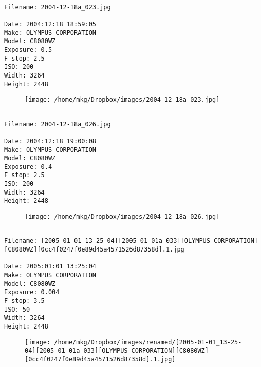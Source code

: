 \clearpage
\onecolumn
\noindent 
\noindent
\begin{lstlisting}

Filename: 2004-12-18a_023.jpg

Date: 2004:12:18 18:59:05
Make: OLYMPUS CORPORATION
Model: C8080WZ
Exposure: 0.5
F stop: 2.5
ISO: 200
Width: 3264
Height: 2448
\end{lstlisting}
\clearpage

\begin{figure}
\texttt{[image: /home/mkg/Dropbox/images/2004-12-18a\_023.jpg]}
\end{figure}
    
\clearpage
\onecolumn
\noindent 
\noindent
\begin{lstlisting}

Filename: 2004-12-18a_026.jpg

Date: 2004:12:18 19:00:08
Make: OLYMPUS CORPORATION
Model: C8080WZ
Exposure: 0.4
F stop: 2.5
ISO: 200
Width: 3264
Height: 2448
\end{lstlisting}
\clearpage

\begin{figure}
\texttt{[image: /home/mkg/Dropbox/images/2004-12-18a\_026.jpg]}
\end{figure}
    
\clearpage
\onecolumn
\noindent 
\noindent
\begin{lstlisting}

Filename: [2005-01-01_13-25-04][2005-01-01a_033][OLYMPUS_CORPORATION][C8080WZ][0cc4f0247f0e89d45a4571526d87358d].1.jpg

Date: 2005:01:01 13:25:04
Make: OLYMPUS CORPORATION
Model: C8080WZ
Exposure: 0.004
F stop: 3.5
ISO: 50
Width: 3264
Height: 2448
\end{lstlisting}
\clearpage

\begin{figure}
\texttt{[image: /home/mkg/Dropbox/images/renamed/[2005-01-01\_13-25-04][2005-01-01a\_033][OLYMPUS\_CORPORATION][C8080WZ][0cc4f0247f0e89d45a4571526d87358d].1.jpg]}
\end{figure}
    
